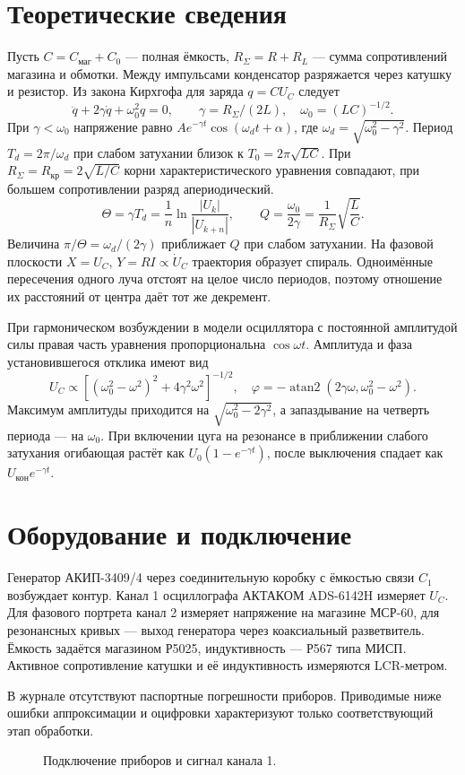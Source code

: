 \documentclass[a4paper,12pt]{article}
\begin{document}
\section{Теоретические сведения}
Пусть $C=C_{\textrm{маг}}+C_0$ --- полная ёмкость, $R_\Sigma=R+R_L$ --- сумма сопротивлений магазина и обмотки. Между импульсами конденсатор разряжается через катушку и резистор. Из закона Кирхгофа для заряда $q=CU_C$ следует
\[
 \ddot q+2\gamma\dot q+\omega_0^2q=0,\qquad
 \gamma=R_\Sigma/(2L),\quad \omega_0=(LC)^{-1/2}.
\]
При $\gamma<\omega_0$ напряжение равно $Ae^{-\gamma t}\cos(\omega_dt+\alpha)$, где $\omega_d=\sqrt{\omega_0^2-\gamma^2}$. Период $T_d=2\pi/\omega_d$ при слабом затухании близок к $T_0=2\pi\sqrt{LC}$. При $R_\Sigma=R_{\textrm{кр}}=2\sqrt{L/C}$ корни характеристического уравнения совпадают, при большем сопротивлении разряд апериодический.
\[
 \Theta=\gamma T_d=\frac1n\ln\frac{|U_k|}{|U_{k+n}|},
 \qquad Q=\frac{\omega_0}{2\gamma}=\frac{1}{R_\Sigma}\sqrt{\frac LC}.
\]
Величина $\pi/\Theta=\omega_d/(2\gamma)$ приближает $Q$ при слабом затухании. На фазовой плоскости $X=U_C$, $Y=RI\propto\dot U_C$ траектория образует спираль. Одноимённые пересечения одного луча отстоят на целое число периодов, поэтому отношение их расстояний от центра даёт тот же декремент.
\par При гармоническом возбуждении в модели осциллятора с постоянной амплитудой силы правая часть уравнения пропорциональна $\cos\omega t$. Амплитуда и фаза установившегося отклика имеют вид
\[
 U_C\propto[(\omega_0^2-\omega^2)^2+4\gamma^2\omega^2]^{-1/2},
 \quad \varphi=-\operatorname{atan2}(2\gamma\omega,\omega_0^2-\omega^2).
\]
Максимум амплитуды приходится на $\sqrt{\omega_0^2-2\gamma^2}$, а запаздывание на четверть периода --- на $\omega_0$. При включении цуга на резонансе в приближении слабого затухания огибающая растёт как $U_0(1-e^{-\gamma t})$, после выключения спадает как $U_{\textrm{кон}}e^{-\gamma t}$.
\section{Оборудование и подключение}
Генератор АКИП-3409/4 через соединительную коробку с ёмкостью связи $C_1$ возбуждает контур. Канал 1 осциллографа АКТАКОМ ADS-6142H измеряет $U_C$. Для фазового портрета канал 2 измеряет напряжение на магазине МСР-60, для резонансных кривых --- выход генератора через коаксиальный разветвитель. Ёмкость задаётся магазином Р5025, индуктивность --- Р567 типа МИСП. Активное сопротивление катушки и её индуктивность измеряются LCR-метром.
\par В журнале отсутствуют паспортные погрешности приборов. Приводимые ниже ошибки аппроксимации и оцифровки характеризуют только соответствующий этап обработки.
\begin{figure}[H]\centering{}\hfill{}\caption{Подключение приборов и сигнал канала 1.}\end{figure}
\end{document}
